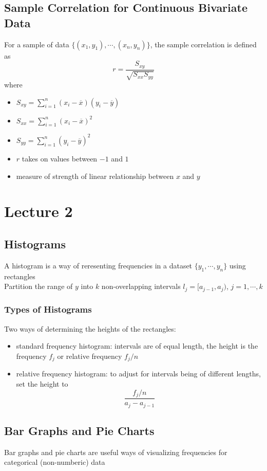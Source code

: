 \documentclass[11pt]{article}
\begin{document}
\subsection{Sample Correlation for Continuous Bivariate Data}
For a sample of data $\{(x_1,y_1),\cdots,(x_n,y_n)\}$, the sample correlation is defined as \[r=\dfrac{S_{xy}}{\sqrt{S_{xx}S_{yy}}}\]
where 
\begin{itemize}
  \item $S_{xy}=\sum_{i=1}^{n}(x_i-\overline{x})(y_i-\overline{y})$
  \item $S_{xx}=\sum_{i=1}^{n}(x_i-\overline{x})^2$
  \item $S_{yy}=\sum_{i=1}^{n}(y_i-\overline{y})^2$
  \item $r$ takes on values between $-1$ and $1$
  \item measure of strength of linear relationship between $x$ and $y$
\end{itemize}

\section{Lecture 2}
\subsection{Histograms}
A histogram is a way of reresenting frequencies in a dataset $\{y_1,\cdots,y_n\}$ using rectangles \\
Partition the range of $y$ into $k$ non-overlapping intervals $l_j=[a_{j-1}, a_j)$, $j=1,\cdots,k$ 
\subsubsection{Types of Histograms}
Two ways of determining the heights of the rectangles: 
\begin{itemize}
  \item standard frequency histogram: intervals are of equal length, the height is the frequency $f_j$ or relative frequency $f_j/n$
  \item relative frequency histogram: to adjust for intervals being of different lengths, set the height to 
  \[\frac{f_j/n}{a_j-a_{j-1}}\]
\end{itemize}
\subsection{Bar Graphs and Pie Charts}
Bar graphs and pie charts are useful ways of visualizing frequencies for categorical (non-numberic) data 
\end{document}
